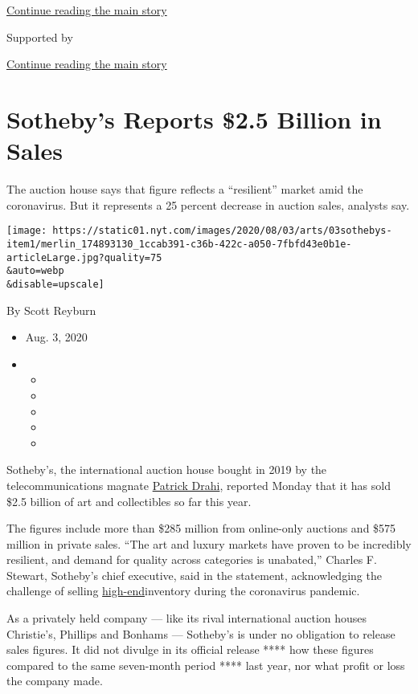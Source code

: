 \protect\hyperlink{after-top}{Continue reading the main story}

Supported by

\protect\hyperlink{after-sponsor}{Continue reading the main story}

\hypertarget{sothebys-reports-25-billion-in-sales}{%
\section{Sotheby's Reports \$2.5 Billion in
Sales}\label{sothebys-reports-25-billion-in-sales}}

The auction house says that figure reflects a ``resilient'' market amid
the coronavirus. But it represents a 25 percent decrease in auction
sales, analysts say.

\texttt{[image: https://static01.nyt.com/images/2020/08/03/arts/03sothebys-item1/merlin\_174893130\_1ccab391-c36b-422c-a050-7fbfd43e0b1e-articleLarge.jpg?quality=75\\\&auto=webp\\\&disable=upscale]}

By Scott Reyburn

\begin{itemize}
\item
  Aug. 3, 2020
\item
  \begin{itemize}
  \item
  \item
  \item
  \item
  \item
  \end{itemize}
\end{itemize}

Sotheby's, the international auction house bought in 2019 by the
telecommunications magnate
\href{https://www.nytimes.com/2019/06/17/business/sothebys-patrick-drahi-bidfair.html}{Patrick
Drahi}, reported Monday that it has sold \$2.5 billion of art and
collectibles so far this year.

The figures include more than \$285 million from online-only auctions
and \$575 million in private sales. ``The art and luxury markets have
proven to be incredibly resilient, and demand for quality across
categories is unabated,'' Charles F. Stewart, Sotheby's chief executive,
said in the statement, acknowledging the challenge of selling
\href{https://www.nytimes.com/2020/07/10/your-money/auctions-wealth-coronavirus.html}{high-end}inventory
during the coronavirus pandemic.

As a privately held company --- like its rival international auction
houses Christie's, Phillips and Bonhams --- Sotheby's is under no
obligation to release sales figures. It did not divulge in its official
release **** how these figures compared to the same seven-month period
**** last year, nor what profit or loss the company made.

